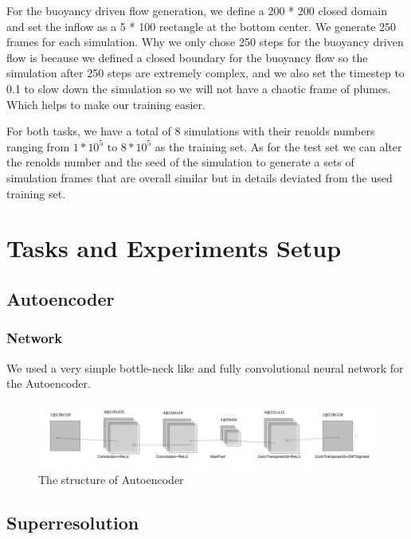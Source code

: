 \documentclass[a4paper,12pt,twoside]{report}
\begin{document}
For the buoyancy driven flow generation, we define a 200 * 200 closed domain and set the inflow as a 5 * 100 rectangle at the bottom center. We generate 250 frames for each simulation. Why we only chose 250 steps for the buoyancy driven flow is because we defined a closed boundary for the buoyancy flow so the simulation after 250 steps are extremely complex, and we also set the timestep to 0.1 to slow down the simulation so we will not have a chaotic frame of plumes. Which helps to make our training easier.

For both tasks, we have a total of 8 simulations with their renolds numbers ranging from $1*10^5$ to $8*10^5$ as the training set. As for the test set we can alter the renolds number and the seed of the simulation to generate a sets of simulation frames that are overall similar but in details deviated from the used training set. 








\chapter{Tasks and Experiments Setup}

\section{Autoencoder}
\subsection{Network}
We used a very simple bottle-neck like and fully convolutional neural network for the Autoencoder.

\begin{figure}
  \centering
  \includegraphics[width=\textwidth]{autoencoder.png}
  \caption{The structure of Autoencoder}
\end{figure}

\section{Superresolution}
\end{document}
